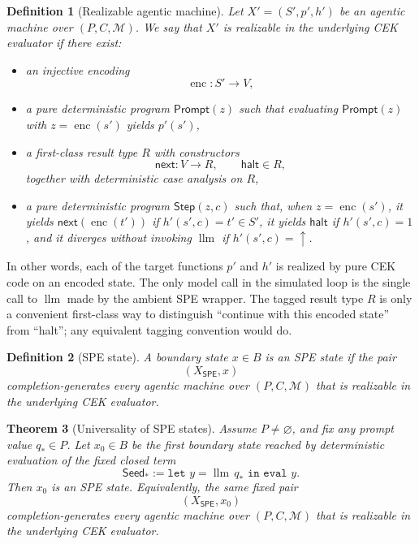\documentclass[11pt]{article}
\newtheorem{definition}{Definition}[section]
\newtheorem{theorem}[definition]{Theorem}
\newcommand{\SPE}{\mathsf{SPE}}
\newcommand{\enc}{\operatorname{enc}}
\newcommand{\llm}{\operatorname{llm}}
\begin{document}
\begin{definition}[Realizable agentic machine]\label{def:realizable}
Let $X'=(S',p',h')$ be an agentic machine over $(P,C,\mathcal{M})$. We say that $X'$ is \emph{realizable in the underlying CEK evaluator} if there exist:
\begin{itemize}
    \item an injective encoding
    \[
    \enc:S'\to V,
    \]
    \item a pure deterministic program $\mathsf{Prompt}(z)$ such that evaluating $\mathsf{Prompt}(z)$ with $z=\enc(s')$ yields $p'(s')$,
    \item a first-class result type $R$ with constructors
    \[
    \mathsf{next}:V\to R,
    \qquad
    \mathsf{halt}\in R,
    \]
    together with deterministic case analysis on $R$,
    \item a pure deterministic program $\mathsf{Step}(z,c)$ such that, when $z=\enc(s')$, it yields $\mathsf{next}(\enc(t'))$ if $h'(s',c)=t'\in S'$, it yields $\mathsf{halt}$ if $h'(s',c)=1$, and it diverges without invoking $\llm$ if $h'(s',c)=\uparrow$.
\end{itemize}
\end{definition}

In other words, each of the target functions $p'$ and $h'$ is realized by pure CEK code on an encoded state. The only model call in the simulated loop is the single call to $\llm$ made by the ambient SPE wrapper. The tagged result type $R$ is only a convenient first-class way to distinguish ``continue with this encoded state'' from ``halt''; any equivalent tagging convention would do.

\begin{definition}[SPE state]\label{def:spe-state}
A boundary state $x\in B$ is an \emph{SPE state} if the pair
\[
(X_{\SPE},x)
\]
completion-generates every agentic machine over $(P,C,\mathcal{M})$ that is realizable in the underlying CEK evaluator.
\end{definition}

\begin{theorem}[Universality of SPE states]\label{thm:main}
Assume $P\neq\varnothing$, and fix any prompt value $q_{\ast}\in P$. Let $x_0\in B$ be the first boundary state reached by deterministic evaluation of the fixed closed term
\[
\mathsf{Seed}_{\ast}:=\texttt{let } y = \llm\, q_{\ast} \texttt{ in eval } y.
\]
Then $x_0$ is an SPE state. Equivalently, the same fixed pair
\[
(X_{\SPE},x_0)
\]
completion-generates every agentic machine over $(P,C,\mathcal{M})$ that is realizable in the underlying CEK evaluator.
\end{theorem}
\end{document}
